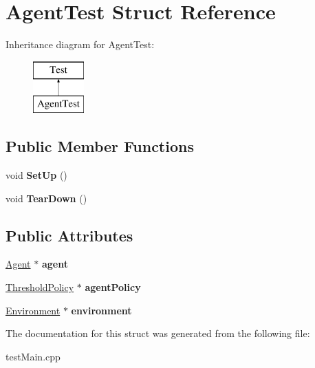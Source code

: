 \hypertarget{struct_agent_test}{}\section{Agent\+Test Struct Reference}
\label{struct_agent_test}
Inheritance diagram for Agent\+Test\+:\begin{figure}[H]
\begin{center}
\leavevmode
\includegraphics[height=2.000000cm]{struct_agent_test}
\end{center}
\end{figure}
\subsection*{Public Member Functions}
\begin{DoxyCompactItemize}
\item 
\mbox{\label{struct_agent_test_a467ab33264562731ed09a47076816e29}} 
void {\bfseries Set\+Up} ()
\item 
\mbox{\label{struct_agent_test_adc6effea04ccb32c994552c46026102e}} 
void {\bfseries Tear\+Down} ()
\end{DoxyCompactItemize}
\subsection*{Public Attributes}
\begin{DoxyCompactItemize}
\item 
\mbox{\label{struct_agent_test_a6faab5745a5cf6392bcf2326e5f87fc1}} 
\mbox{\hyperlink{class_agent}{Agent}} $\ast$ {\bfseries agent}
\item 
\mbox{\label{struct_agent_test_a53b10928dc193dc3837e0c83539cdbf3}} 
\mbox{\hyperlink{class_threshold_policy}{Threshold\+Policy}} $\ast$ {\bfseries agent\+Policy}
\item 
\mbox{\label{struct_agent_test_a29ce9e23c68d43632d7bcd53992f32cd}} 
\mbox{\hyperlink{class_environment}{Environment}} $\ast$ {\bfseries environment}
\end{DoxyCompactItemize}


The documentation for this struct was generated from the following file\+:\begin{DoxyCompactItemize}
\item 
test\+Main.\+cpp\end{DoxyCompactItemize}
